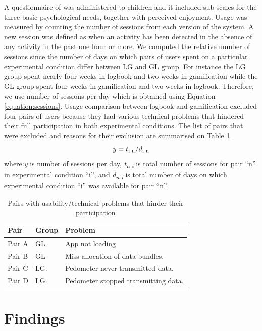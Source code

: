\documentclass{sig-alternate}
\def\SB#1{\textsubscript{\textcolor{black}{#1}}}
\begin{document}
A questionnaire of was administered to children and it included sub-scales for the three basic psychological needs, together with perceived enjoyment.
Usage was measured by counting the number of sessions from each version of the system. A new session was defined as when an activity has been detected in the absence of any activity in the past one hour or more. We computed the relative number of sessions since the number of days on which pairs of users spent on a particular experimental condition differ between LG and GL group. For instance the LG group spent nearly four weeks in logbook and two weeks in gamification while the GL group spent four weeks in gamification and two weeks in logbook. Therefore, we use number of sessions per day which is obtained using Equation \ref{equation:sessions}. Usage comparison between logbook and gamification excluded four pairs of users because they had various technical problems that hindered their full participation in both experimental conditions. The list of pairs that were excluded and reasons for their exclusion are summarised on Table \ref{table:usageproblems}.
\begin{equation}
\label{equation:sessions}
y=t\SB{i n}/d\SB{i n}
\end{equation}
where:\emph{y} is number of sessions per day, \emph{t\SB{n i}} is total number of sessions for pair ``n'' in experimental condition ``i'', and \emph{d\SB{n i}} is total number of days on which experimental condition ``i'' was available for pair ``n''.
\begin{table}[h!]
  \begin{center}
    \caption{Pairs with usability/technical problems that hinder their participation}
    \label{table:usageproblems}
	\begin{tabular}{|p{1cm}|p{0.8cm}|p{5cm}|}
		\hline
		Pair&Group&Problem\\
		\hline
		Pair A&GL &App not loading\\
		\hline
		Pair B&GL& Miss-allocation of data bundles.\\
		\hline
		Pair C & LG.& Pedometer never transmitted data.\\
		\hline
		Pair D & LG.& Pedometer stopped transmitting data.\\
	\hline
	\end{tabular}
  \end{center}
\end{table}
\section{Findings}
\end{document}
